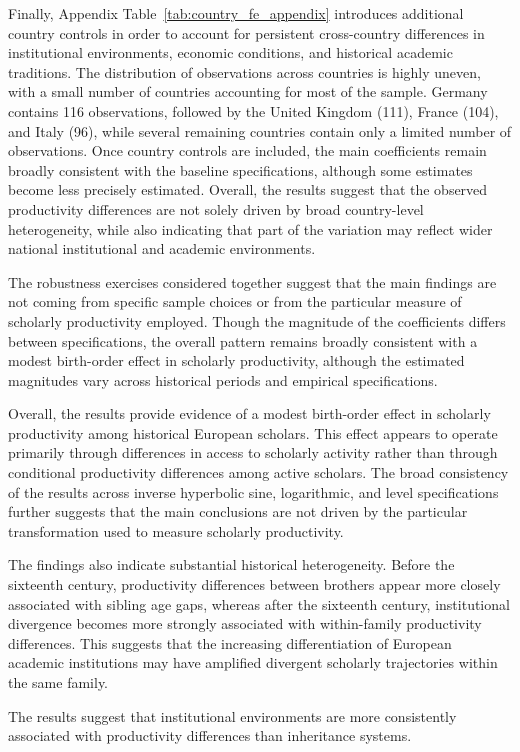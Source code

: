 Finally, Appendix Table~\ref{tab:country_fe_appendix} introduces additional country controls in order to account for persistent cross-country differences in institutional environments, economic conditions, and historical academic traditions. The distribution of observations across countries is highly uneven, with a small number of countries accounting for most of the sample. Germany contains 116 observations, followed by the United Kingdom (111), France (104), and Italy (96), while several remaining countries contain only a limited number of observations. Once country controls are included, the main coefficients remain broadly consistent with the baseline specifications, although some estimates become less precisely estimated. Overall, the results suggest that the observed productivity differences are not solely driven by broad country-level heterogeneity, while also indicating that part of the variation may reflect wider national institutional and academic environments.

The robustness exercises considered together suggest that the main findings are not coming from specific sample choices or from the particular measure of scholarly productivity employed. Though the magnitude of the coefficients differs between specifications, the overall pattern remains broadly consistent with a modest birth-order effect in scholarly productivity, although the estimated magnitudes vary across historical periods and empirical specifications.

Overall, the results provide evidence of a modest birth-order effect in scholarly productivity among historical European scholars. This effect appears to operate primarily through differences in access to scholarly activity rather than through conditional productivity differences among active scholars. The broad consistency of the results across inverse hyperbolic sine, logarithmic, and level specifications further suggests that the main conclusions are not driven by the particular transformation used to measure scholarly productivity.

The findings also indicate substantial historical heterogeneity. Before the sixteenth century, productivity differences between brothers appear more closely associated with sibling age gaps, whereas after the sixteenth century, institutional divergence becomes more strongly associated with within-family productivity differences. This suggests that the increasing differentiation of European academic institutions may have amplified divergent scholarly trajectories within the same family.

The results suggest that institutional environments are more consistently associated with productivity differences than inheritance systems.